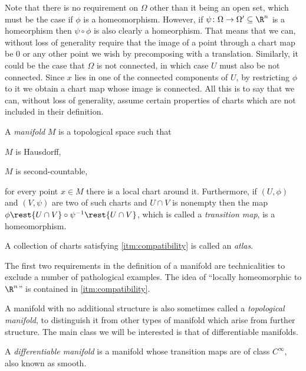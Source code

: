 \documentclass[12pt,oneside]{book}
\begin{document}
Note that there is no requirement on \( \Omega \) other than it being an open set, which must be the case if \( \phi \) is a homeomorphism. However, if \( \psi \colon \Omega \to \Omega' \subseteq \R^n \) is a homeorphism then \( \psi \circ \phi \) is also clearly a homeorphism. That means that we can, without loss of generality require that the image of a point through a chart map be 0 or any other point we wish by precomposing with a translation. Similarly, it could be the case that \( \Omega \) is not connected, in which case \( U \) must also be not connected. Since \( x \) lies in one of the connected components of \( U \), by restricting \( \phi \) to it we obtain a chart map whose image is connected. All this is to say that we can, without loss of generality, assume certain properties of charts which are not included in their definition.

\begin{definition}[Manifold]
	A \emph{manifold} \( M \) is a topological space such that
	\begin{points}
	\item \( M \) is Hausdorff,
	\item \( M \) is second-countable,
	\item \label{itm:compatibility} for every point \( x \in M \) there is a local chart around it. Furthermore, if \( (U,\phi) \) and \( (V, \psi) \) are two of such charts and \( U \cap V \) is nonempty then the map \( \phi\rest{U \cap V} \circ \psi^{-1}\rest{U \cap V} \), which is called a \emph{transition map}, is a homeomorphism. 
	\end{points}
	A collection of charts satisfying \ref{itm:compatibility} is called an \emph{atlas}.
\end{definition}

The first two requirements in the definition of a manifold are technicalities to exclude a number of pathological examples. The idea of ``locally homeomorphic to \( \R^n \)'' is contained in \ref{itm:compatibility}.

A manifold with no additional structure is also sometimes called a \emph{topological manifold}, to distinguish it from other types of manifold which arise from further structure. The main class we will be interested is that of differentiable manifolds.

\begin{definition} A \emph{differentiable manifold} is a manifold whose transition maps are of class \( C^{\infty} \), also known as smooth.
\end{definition}
\end{document}
